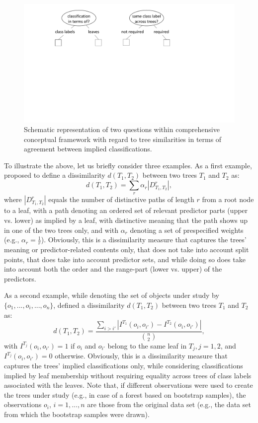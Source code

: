\begin{figure}[H]
		\includegraphics[width=\linewidth, trim=0 11cm 0 0, clip]{similarities.pdf}
	\caption{Schematic representation of two questions within comprehensive conceptual framework with regard to tree similarities in terms of agreement between implied classifications.}
	\label{figSim2}
\end{figure}


To illustrate the above, let us briefly consider three examples. As a first example, \citet{Shannon1999} proposed to define a dissimilarity $d(T_1, T_2)$  between two trees $T_1$ and  $T_2$ as:
\begin{equation}
d(T_1, T_2) = \sum_{r}{\alpha_r |D^r_{T_1,T_2}|},
\end{equation}
where $|D^r_{T_1,T_2}|$ equals the number of distinctive paths of length $r$ from a root node to a leaf, with a path denoting an ordered set of relevant predictor parts (upper vs. lower) as implied by a leaf, with distinctive meaning that the path shows up in one of the two trees only, and with $\alpha_r$ denoting a set of prespecified weights (e.g., $\alpha_r = \frac{1}{r}$). Obviously, this is a dissimilarity measure that captures the trees' meaning or predictor-related contents only, that does not take into account split points, that does take into account predictor sets, and while doing so does take into account both the order and the range-part (lower vs. upper) of the predictors.

As a second example, while denoting the set of objects under study by $\{o_1,...,o_i,...,o_n\}$, \citet{Chipman1998} defined a dissimilarity $d(T_1, T_2)$ between two trees $T_1$ and $T_2$ as:
\begin{equation}
d(T_1, T_2)= \frac{\sum_{i>i'}|I^{T_1}(o_i, o_{i'}) - I^{T_2}(o_i, o_{i'}) |}{\binom{n}{2}},
\end{equation}
with $I^{T_j}(o_i, o_{i'}) = 1$ if $o_i$ and $o_{i'}$ belong to the same leaf in $T_j, j=1,2$, and  $I^{T_j}(o_i, o_{i'}) = 0$ otherwise. Obviously, this is a dissimilarity measure that captures the trees' implied classifications only, while considering classifications implied by leaf membership without requiring equality across trees of class labels associated with the leaves. Note that, if different observations were used to create the trees under study (e.g., in case of a forest based on bootstrap samples), the observations $o_i$, $i=1,...,n$ are those from the original data set (e.g., the data set from which the bootstrap samples were drawn).

